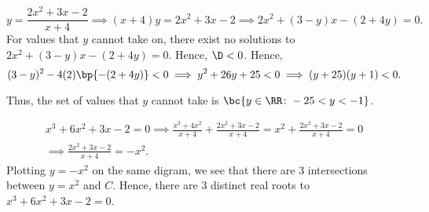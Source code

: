 \begin{solution}
\begin{ppart}
\begin{center}
        \end{center}
    \end{ppart}
    \begin{ppart}
        \[y = \frac{2x^2 + 3x - 2}{x+4} \implies (x+4)y = 2x^2 + 3x -2 \implies 2x^2 + (3-y)x - (2+4y) = 0.\] For values that $y$ cannot take on, there exist no solutions to $2x^2 + (3-y)x - (2+4y) = 0$. Hence, $\D < 0$. Hence, \[(3-y)^2 - 4(2)\bp{-(2+4y)} < 0 \implies y^2+26y+25 < 0 \implies (y+25)(y+1) <0.\]
        \begin{center}
        \end{center}
        Thus, the set of values that $y$ cannot take is $\bc{y \in \RR \colon -25 < y < -1}$.
    \end{ppart}
    \begin{ppart}
        \begin{gather*}
            x^3+6x^2+3x-2 = 0 \implies \frac{x^3+4x^2}{x+4} + \frac{2x^2 + 3x-2}{x+4} = x^2 + \frac{2x^2 + 3x-2}{x+4} = 0 \\
            \implies \frac{2x^2 + 3x-2}{x+4} = -x^2.
        \end{gather*}
        Plotting $y=-x^2$ on the same digram, we see that there are 3 intersections between $y=x^2$ and $C$. Hence, there are 3 distinct real roots to $x^3+6x^2+3x-2 = 0$.
    \end{ppart}
\end{solution}